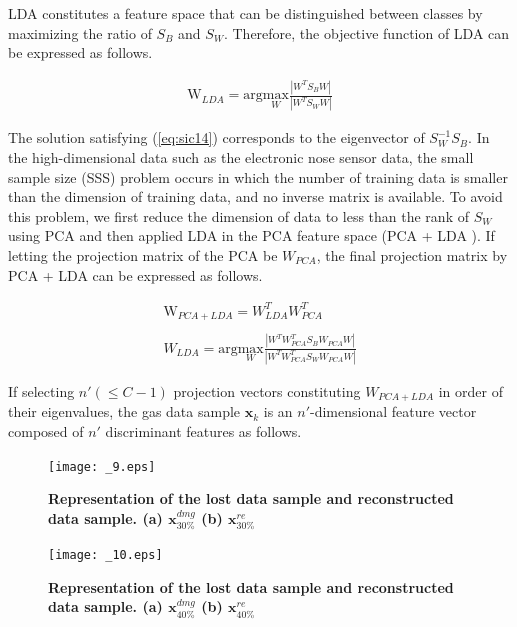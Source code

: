 \documentclass[10pt,letterpaper]{article}
\begin{document}
LDA constitutes a feature space that can be distinguished between classes by maximizing the ratio of $S_B$ and $S_W$. Therefore, the objective function of LDA can be expressed as follows. 


\begin{eqnarray}
\label{eq:sic14}
	\mathrm W_{LDA} = \textrm{arg} \underset{W}{\textrm{max}}\frac{|W^{T}S_{B}W|}{|W^{T}S_{W}W|}
\end{eqnarray}

The solution satisfying (\ref{eq:sic14}) corresponds to the eigenvector of $S_W^{-1}S_B$. 
In the high-dimensional data such as the electronic nose sensor data, the small sample size (SSS) problem \cite{chen2000new} occurs in which the number of training data is smaller than the dimension of training data, and no inverse matrix is available. 
To avoid this problem, we first reduce the dimension of data to less than the rank of $S_W$ using PCA and then applied LDA in the PCA feature space (PCA + LDA \cite{belhumeur1997eigenfaces}). If letting the projection matrix of the PCA be $W_{PCA}$, the final projection matrix by PCA + LDA can be expressed as follows.


\begin{eqnarray}
\label{eq:sic15}
	\mathrm W_{PCA+LDA} = W_{LDA}^{T}W_{PCA}^{T}\nonumber\\\nonumber\\W_{LDA} = \textrm{arg} \underset{W}{\textrm{max}}\frac{|W^{T}W_{PCA}^{T}S_{B}W_{PCA}W|}{|W^{T}W_{PCA}^{T}S_{W}W_{PCA}W|}
\end{eqnarray}


If selecting $n' (\le C-1)$ projection vectors constituting $W_{PCA+LDA}$ in order of their eigenvalues, the gas data sample $\textbf{x}_k$ is an $n'$-dimensional feature vector composed of $n'$ discriminant features as follows.

\begin{figure}[t]
	\centering
    \texttt{[image: \_9.eps]}
    \caption{\bf{Representation of the lost data sample and reconstructed data sample. (a) $\textbf{x}_{30\%}^{dmg}$ (b) $\textbf{x}_{30\%}^{re}$}\label{fig. 9}}
\end{figure}

\begin{figure}[t]
	\centering
    \texttt{[image: \_10.eps]}
    \caption{\bf{Representation of the lost data sample and reconstructed data sample. (a) $\textbf{x}_{40\%}^{dmg}$ (b) $\textbf{x}_{40\%}^{re}$}\label{fig. 10}}
\end{figure}
\end{document}
